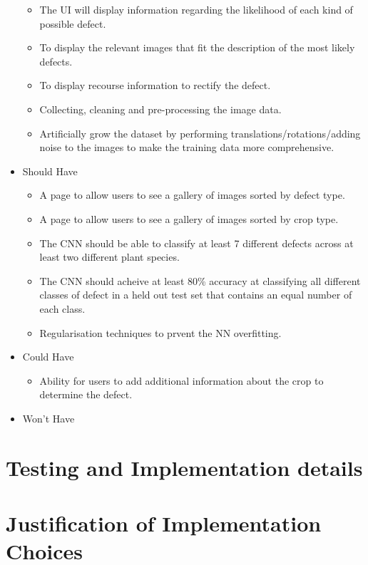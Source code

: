 \begin{itemize}
\begin{itemize}
  	\item The UI will display information regarding the likelihood of each kind of possible defect.
  	\item To display the relevant images that fit the description of the most likely defects.
  	\item To display recourse information to rectify the defect.
  	\item Collecting, cleaning and pre-processing the image data.
    \item Artificially grow the dataset by performing translations/rotations/adding noise to the images to make the training data more comprehensive.
  \end{itemize}
  \item Should Have
  \begin{itemize}
    \item A page to allow users to see a gallery of images sorted by
      defect type.
    \item A page to allow users to see a gallery of images sorted by
      crop type.
    \item The CNN should be able to classify at least 7 different defects across at least two different plant species.
    \item The CNN should acheive at least 80\% accuracy at classifying all different classes of defect in a held out test set that contains an equal number of each class.
  	\item Regularisation techniques to prvent the NN overfitting.
  \end{itemize}
  \item Could Have
  \begin{itemize}
    \item Ability for users to add additional information about the crop
      to determine the defect.
  \end{itemize}
  \item Won't Have
\end{itemize}
\section{Testing and Implementation details}


\section{Justification of Implementation Choices}
